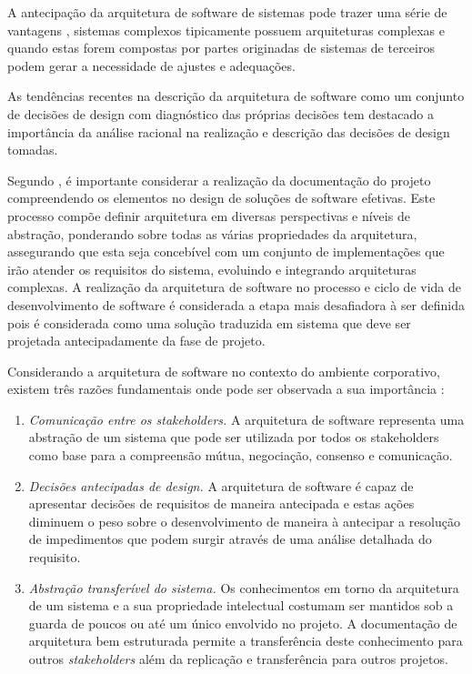 A antecipação da arquitetura de software de sistemas pode trazer uma série de vantagens \cite{babar2013agile}, sistemas complexos tipicamente possuem arquiteturas complexas e quando estas forem compostas por partes originadas de sistemas de terceiros podem gerar a necessidade de ajustes e adequações. 

As tendências recentes na descrição da arquitetura de software como um conjunto de decisões de design com diagnóstico das próprias decisões tem destacado a importância da análise racional na realização e descrição das decisões de design tomadas. \cite{babar2009software}

Segundo \cite{hanschke2015integrating}, é importante considerar a realização da documentação do projeto compreendendo os elementos no design de soluções de software efetivas. Este processo compõe definir arquitetura em diversas perspectivas e níveis de abstração, ponderando sobre todas as várias propriedades da arquitetura, assegurando que esta seja concebível com um conjunto de implementações que irão atender os requisitos do sistema, evoluindo e integrando arquiteturas complexas. A realização da arquitetura de software no processo e ciclo de vida de desenvolvimento de software é considerada a etapa mais desafiadora à ser definida pois é considerada como uma solução traduzida em sistema que deve ser projetada antecipadamente da fase de projeto. 

Considerando a arquitetura de software no contexto do ambiente corporativo, existem três razões fundamentais onde pode ser observada a sua importância \cite{bass2007software}:

\begin{enumerate}
    \item \textit{Comunicação entre os stakeholders.} A arquitetura de software representa uma abstração de um sistema que pode ser utilizada por todos os stakeholders como base para a compreensão mútua, negociação, consenso e comunicação. 
    \item \textit{Decisões antecipadas de design.} A arquitetura de software é capaz de apresentar decisões de requisitos de maneira antecipada e estas ações diminuem o peso sobre o desenvolvimento de maneira à antecipar a resolução de impedimentos que podem surgir através de uma análise detalhada do requisito.
    \item \textit{Abstração transferível do sistema.} Os conhecimentos em torno da arquitetura de um sistema e a sua propriedade intelectual costumam ser mantidos sob a guarda de poucos ou até um único envolvido no projeto. A documentação de arquitetura bem estruturada permite a transferência deste conhecimento para outros \textit{stakeholders} além da replicação e transferência para outros projetos.
    
\end{enumerate}

